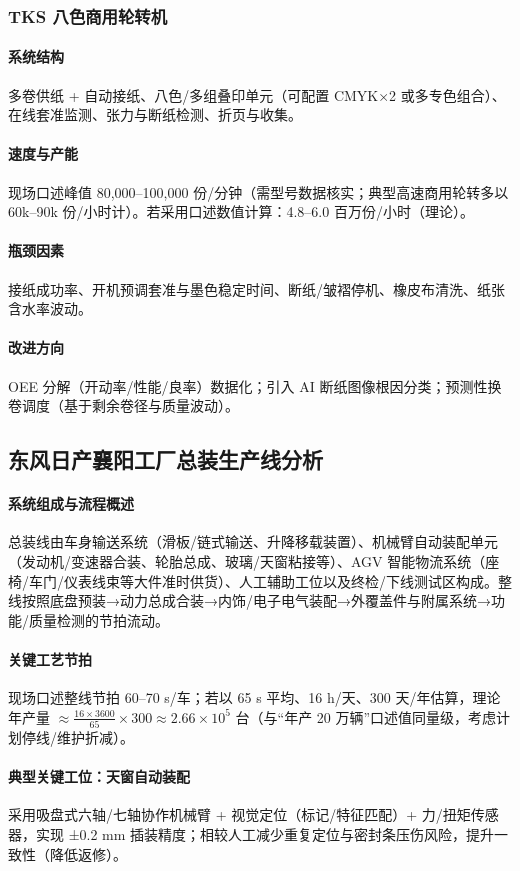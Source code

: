 \subsubsection{TKS 八色商用轮转机}
\paragraph{系统结构} 多卷供纸 + 自动接纸、八色/多组叠印单元（可配置 CMYK×2 或多专色组合）、在线套准监测、张力与断纸检测、折页与收集。\paragraph{速度与产能} 现场口述峰值 80{,}000--100{,}000 份/分钟（需型号数据核实；典型高速商用轮转多以 60k--90k 份/小时计）。若采用口述数值计算：4.8--6.0 百万份/小时（理论）。\paragraph{瓶颈因素} 接纸成功率、开机预调套准与墨色稳定时间、断纸/皱褶停机、橡皮布清洗、纸张含水率波动。\paragraph{改进方向} OEE 分解（开动率/性能/良率）数据化；引入 AI 断纸图像根因分类；预测性换卷调度（基于剩余卷径与质量波动）。

\subsection{东风日产襄阳工厂总装生产线分析}
\paragraph{系统组成与流程概述} 总装线由车身输送系统（滑板/链式输送、升降移载装置）、机械臂自动装配单元（发动机/变速器合装、轮胎总成、玻璃/天窗粘接等）、AGV 智能物流系统（座椅/车门/仪表线束等大件准时供货）、人工辅助工位以及终检/下线测试区构成。整线按照底盘预装→动力总成合装→内饰/电子电气装配→外覆盖件与附属系统→功能/质量检测的节拍流动。
\paragraph{关键工艺节拍} 现场口述整线节拍 60--70 s/车；若以 65 s 平均、16 h/天、300 天/年估算，理论年产量 \(\approx \frac{16\times 3600}{65} \times 300 \approx 2.66\times 10^5\) 台（与“年产 20 万辆”口述值同量级，考虑计划停线/维护折减）。
\paragraph{典型关键工位：天窗自动装配} 采用吸盘式六轴/七轴协作机械臂 + 视觉定位（标记/特征匹配）+ 力/扭矩传感器，实现 ±0.2 mm 插装精度；相较人工减少重复定位与密封条压伤风险，提升一致性（降低返修）。
